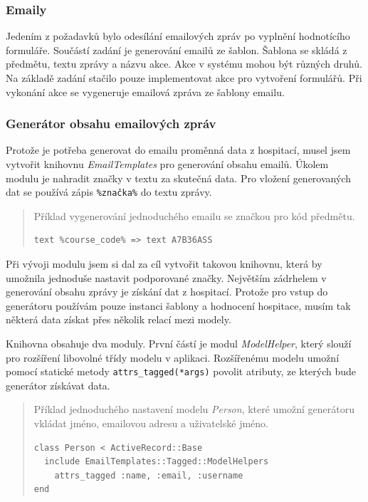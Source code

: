 \subsubsection{Emaily}
Jedením z požadavků bylo odesílání emailových zpráv po vyplnění hodnotícího formuláře. Součástí zadání je generování emailů ze šablon. Šablona se skládá z předmětu, textu zprávy a názvu akce. Akce v systému mohou být různých druhů. Na základě zadání stačilo pouze implementovat akce pro vytvoření formulářů. Při vykonání akce se vygeneruje emailová zpráva ze šablony emailu.

\subsubsection{Generátor obsahu emailových zpráv}
Protože je potřeba generovat do emailu proměnná data z hospitací, musel jsem vytvořit knihovnu \textit{EmailTemplates} pro generování obsahu emailů. Úkolem modulu je nahradit značky v textu za skutečná data. Pro vložení generovaných dat se používá zápis \verb|%značka%| do textu zprávy. 
\begin{quote}
Příklad vygenerování jednoduchého emailu se značkou pro kód předmětu.
\begin{verbatim}
text %course_code% => text A7B36ASS
\end{verbatim} 
\end{quote}

Při vývoji modulu jsem si dal za cíl vytvořit takovou knihovnu, která by umožnila jednoduše nastavit podporované značky. Největším zádrhelem v generování obsahu zprávy je získání dat z hospitací. Protože pro vstup do generátoru používám pouze instanci šablony a hodnocení hospitace, musím tak některá data získat přes několik relací mezi modely.

Knihovna obsahuje dva moduly. První částí je modul \textit{ModelHelper}, který slouží pro rozšíření libovolné třídy modelu v aplikaci. Rozšířenému modelu umožní pomocí statické metody \verb|attrs_tagged(*args)| povolit atributy, ze kterých bude generátor získávat data. 

\begin{quote}
Příklad jednoduchého nastavení modelu \textit{Person}, které umožní generátoru vkládat jméno, emailovou adresu a uživatelské jméno.
\begin{verbatim}
class Person < ActiveRecord::Base
  include EmailTemplates::Tagged::ModelHelpers
    attrs_tagged :name, :email, :username
end
\end{verbatim} 
\end{quote}

